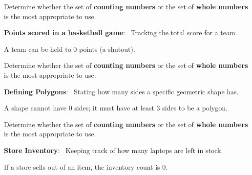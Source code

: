 \documentclass{ximera}[font=12pt]  %
\begin{document}
\begin{problem}
    Determine whether the set of \textbf{counting numbers} or the set of \textbf{whole numbers} is the most appropriate to use.

    \begin{center}
        \textbf{Points scored in a basketball game}: \ Tracking the total score for a team.
    \end{center}

\begin{multipleChoice}
\end{multipleChoice}
\begin{feedback}
    A team can be held to 0 points (a shutout).
\end{feedback}
\end{problem}

\begin{problem}
    Determine whether the set of \textbf{counting numbers} or the set of \textbf{whole numbers} is the most appropriate to use.

    \begin{center}
            \textbf{Defining Polygons}: \ Stating how many sides a specific geometric shape has.
    \end{center}

\begin{multipleChoice}
\end{multipleChoice}
\begin{feedback}
    A shape cannot have 0 sides; it must have at least 3 sides to be a polygon.
\end{feedback}
\end{problem}

\begin{problem}
    Determine whether the set of \textbf{counting numbers} or the set of \textbf{whole numbers} is the most appropriate to use.

    \begin{center}
        \textbf{Store Inventory}: \ Keeping track of how many laptops are left in stock.
    \end{center}

\begin{multipleChoice}
\end{multipleChoice}
\begin{feedback}
    If a store sells out of an item, the inventory count is 0.
\end{feedback}

\end{problem}
\end{document}
